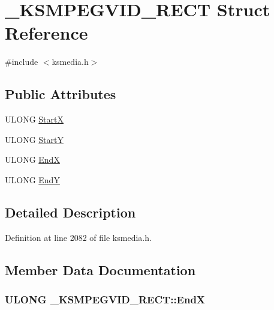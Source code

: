 \hypertarget{struct___k_s_m_p_e_g_v_i_d___r_e_c_t}{}\section{\+\_\+\+K\+S\+M\+P\+E\+G\+V\+I\+D\+\_\+\+R\+E\+CT Struct Reference}
\label{struct___k_s_m_p_e_g_v_i_d___r_e_c_t}


{\ttfamily \#include $<$ksmedia.\+h$>$}

\subsection*{Public Attributes}
\begin{DoxyCompactItemize}
\item 
U\+L\+O\+NG \hyperlink{struct___k_s_m_p_e_g_v_i_d___r_e_c_t_a401bcc6de959698570028ca8be72dc3f}{StartX}
\item 
U\+L\+O\+NG \hyperlink{struct___k_s_m_p_e_g_v_i_d___r_e_c_t_aeb195261cddab19fb3b8f6c1183648ef}{StartY}
\item 
U\+L\+O\+NG \hyperlink{struct___k_s_m_p_e_g_v_i_d___r_e_c_t_aeac2618647156f65f71dda30e059a41d}{EndX}
\item 
U\+L\+O\+NG \hyperlink{struct___k_s_m_p_e_g_v_i_d___r_e_c_t_a612a70905a870490591b7d6e11e1f5d9}{EndY}
\end{DoxyCompactItemize}


\subsection{Detailed Description}


Definition at line 2082 of file ksmedia.\+h.



\subsection{Member Data Documentation}
\subsubsection[{\texorpdfstring{EndX}{EndX}}]{\setlength{\rightskip}{0pt plus 5cm}U\+L\+O\+NG \+\_\+\+K\+S\+M\+P\+E\+G\+V\+I\+D\+\_\+\+R\+E\+C\+T\+::\+EndX}\hypertarget{struct___k_s_m_p_e_g_v_i_d___r_e_c_t_aeac2618647156f65f71dda30e059a41d}{}\label{struct___k_s_m_p_e_g_v_i_d___r_e_c_t_aeac2618647156f65f71dda30e059a41d}



